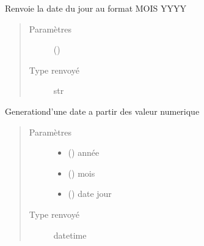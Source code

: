 \documentclass[letterpaper,10pt,french]{sphinxmanual}
\begin{document}

\begin{fulllineitems}
\label{\detokenize{modules/dtemng:toolbox.dtemng.fullmonth}}
Renvoie la date du jour au format MOIS YYYY
\begin{quote}\begin{description}
\item[{Paramètres}] \leavevmode
{} () \textendash{} 

\item[{Type renvoyé}] \leavevmode
str

\end{description}\end{quote}

\end{fulllineitems}


\begin{fulllineitems}
\label{\detokenize{modules/dtemng:toolbox.dtemng.get_date}}
Generationd’une date a partir des valeur numerique
\begin{quote}\begin{description}
\item[{Paramètres}] \leavevmode\begin{itemize}
\item {} 
 () \textendash{} année

\item {} 
 () \textendash{} mois

\item {} 
 () \textendash{} date jour

\end{itemize}

\item[{Type renvoyé}] \leavevmode
datetime

\end{description}\end{quote}

\end{fulllineitems}
\end{document}

